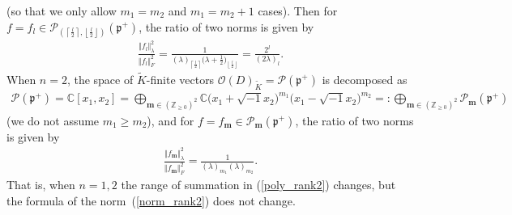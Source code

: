 \documentclass[pdftex]{sigma}
\numberwithin{equation}{section}
\newcommand{\bm}{\mathbf{m}}
\newcommand{\BZ}{\mathbb{Z}}
\newcommand{\BC}{\mathbb{C}}
\newcommand{\fp}{\mathfrak{p}}
\newcommand{\cO}{\mathcal{O}}
\newcommand{\cP}{\mathcal{P}}
\begin{document}
(so that we only allow $m_1=m_2$ and $m_1=m_2+1$ cases).
Then for $f=f_l\in\cP_{\left(\left\lceil\frac{l}{2}\right\rceil,\left\lfloor\frac{l}{2}\right\rfloor\right)}(\fp^+)$,
the ratio of two norms is given by
\begin{gather*} \frac{\Vert f_l\Vert_\lambda^2}{\Vert f_l\Vert_F^2}
=\frac{1}{(\lambda)_{\left\lceil\frac{l}{2}\right\rceil}\big(\lambda+\frac{1}{2}\big)_{\left\lfloor\frac{l}{2}\right\rfloor}}
=\frac{2^l}{(2\lambda)_l}. \end{gather*}
When $n=2$, the space of $\tilde{K}$-finite vectors $\cO(D)_{\tilde{K}}=\cP(\fp^+)$ is decomposed as
\begin{gather*} \cP(\fp^+)=\BC[x_1,x_2]=\bigoplus_{\bm\in(\BZ_{\ge 0})^2}\BC\big(x_1+\sqrt{-1}x_2\big)^{m_1}\big(x_1-\sqrt{-1}x_2\big)^{m_2}
=:\bigoplus_{\bm\in(\BZ_{\ge 0})^2}\cP_\bm(\fp^+) \end{gather*}
(we do not assume $m_1\ge m_2$), and for $f=f_\bm\in\cP_\bm(\fp^+)$, the ratio of two norms is given by
\begin{gather*} \frac{\Vert f_\bm\Vert_\lambda^2}{\Vert f_\bm\Vert_F^2}=\frac{1}{(\lambda)_{m_1}(\lambda)_{m_2}}. \end{gather*}
That is, when $n=1,2$ the range of summation in (\ref{poly_rank2}) changes, but the formula of the norm~(\ref{norm_rank2}) does not change.
\end{document}

